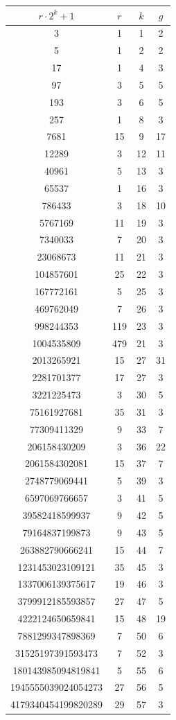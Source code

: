 \documentclass[twoside]{article}
\begin{document}
\begin{enumerate}
\begin{tabular}{cccc}
    \hline
    $r⋅2^k+1$&$r$&$k$&$g$\\
    \hline
    3&1&1&2\\
    5&1&2&2\\
    17&1&4&3\\
    97&3&5&5\\
    193&3&6&5\\
    257&1&8&3\\
    7681&15&9&17\\
    12289&3&12&11\\
    40961&5&13&3\\
    65537&1&16&3\\
    786433&3&18&10\\
    5767169&11&19&3\\
    7340033&7&20&3\\
    23068673&11&21&3\\
    104857601&25&22&3\\
    167772161&5&25&3\\
    469762049&7&26&3\\
    998244353&119&23&3\\
    1004535809&479&21&3\\
    2013265921&15&27&31\\
    2281701377&17&27&3\\
    3221225473&3&30&5\\
    75161927681&35&31&3\\
    77309411329&9&33&7\\
    206158430209&3&36&22\\
    2061584302081&15&37&7\\
    2748779069441&5&39&3\\
    6597069766657&3&41&5\\
    39582418599937&9&42&5\\
    79164837199873&9&43&5\\
    263882790666241&15&44&7\\
    1231453023109121&35&45&3\\
    1337006139375617&19&46&3\\
    3799912185593857&27&47&5\\
    4222124650659841&15&48&19\\
    7881299347898369&7&50&6\\
    31525197391593473&7&52&3\\
    180143985094819841&5&55&6\\
    1945555039024054273&27&56&5\\
    4179340454199820289&29&57&3\\
    \hline
\end{tabular}

\end{enumerate}
\end{document}
